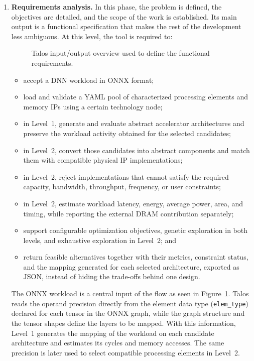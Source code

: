 \begin{enumerate}
\item \textbf{Requirements analysis.} In this phase, the problem is
defined, the objectives are detailed, and the scope of the work is
established. Its main output is a functional specification that makes
the rest of the development less ambiguous. At this level, the tool is
required to:

\begin{figure}[htbp]
  \centering
  \resizebox{\linewidth}{!}{}
  \caption{Talos input/output overview used to define the functional requirements.}
  \label{fig:talos-input-output}
\end{figure}

\begin{itemize}
\item accept a DNN workload in ONNX format;
\item load and validate a YAML pool of characterized processing
elements and memory IPs using a certain technology node;
\item in Level~1, generate and evaluate abstract accelerator
architectures and preserve the workload activity obtained for the
selected candidates;
\item in Level~2, convert those candidates into abstract components and
match them with compatible physical IP implementations;
\item in Level~2, reject implementations that cannot satisfy the
required capacity, bandwidth, throughput, frequency, or user
constraints;
\item in Level~2, estimate workload latency, energy, average power,
area, and timing, while reporting the external DRAM contribution
separately;
\item support configurable optimization objectives, genetic exploration
in both levels, and exhaustive exploration in Level~2; and
\item return feasible alternatives together with their metrics,
constraint status, and the mapping generated for each
selected architecture, exported as JSON, instead of hiding the
trade-offs behind one design.
\end{itemize}

The ONNX workload is a central input of the flow as seen in Figure~\ref{fig:talos-input-output}. 
Talos reads the operand precision directly
from the element data type (\texttt{elem\_type}) declared for each
tensor in the ONNX graph, while the graph structure and the tensor
shapes define the layers to be mapped. With this information, Level~1
generates the mapping of the workload on each candidate architecture
and estimates its cycles and memory accesses. The same precision is
later used to select compatible processing elements in Level~2.


\end{enumerate}

